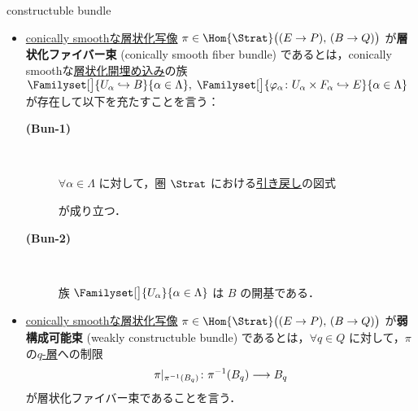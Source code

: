 \documentclass[TQFT_main]{subfiles}
\begin{document}
\begin{mydef}[label=def:cbl,breakable]{constructuble bundle}
    \begin{itemize}
        \item \hyperref[def:c-smooth-map]{conically smoothな層状化写像} $\pi \in \Hom{\Strat}\bigl( (E \to P),\, (B \to Q) \bigr)$ が\textbf{層状化ファイバー束} (conically smooth fiber bundle) であるとは，conically smoothな\hyperref[def:strat-emb]{層状化開埋め込み}の族 $\Familyset[\big]{U_\alpha \hookrightarrow B}{\alpha \in \Lambda},\; \Familyset[\big]{\varphi_\alpha \colon U_\alpha \times F_\alpha \hookrightarrow E}{\alpha \in \Lambda}$ が存在して以下を充たすことを言う：
        \begin{description}
            \item[\textbf{(Bun-1)}]　
            
            $\forall \alpha \in \Lambda$ に対して，圏 $\Strat$ における\hyperref[def:pullback-pushout]{引き戻し}の図式
            
            \begin{center}
            \end{center}
            が成り立つ．

            \item[\textbf{(Bun-2)}]　
            
            族 $\Familyset[\big]{U_\alpha}{\alpha \in \Lambda}$ は $B$ の開基である．
        \end{description}
        
        \item \hyperref[def:c-smooth-map]{conically smoothな層状化写像} $\pi \in \Hom{\Strat}\bigl( (E \to P),\, (B \to Q) \bigr)$ が\textbf{弱構成可能束} (weakly constructuble bundle) であるとは，$\forall q \in Q$ に対して，$\pi$ の\hyperref[def:stratified-space]{$q$-層}への制限
        \begin{align}
            \pi|_{\pi^{-1}(B_q)} \colon \pi^{-1}(B_q) \longrightarrow B_q
        \end{align}
        が層状化ファイバー束であることを言う．


\end{itemize}
\end{mydef}
\end{document}

